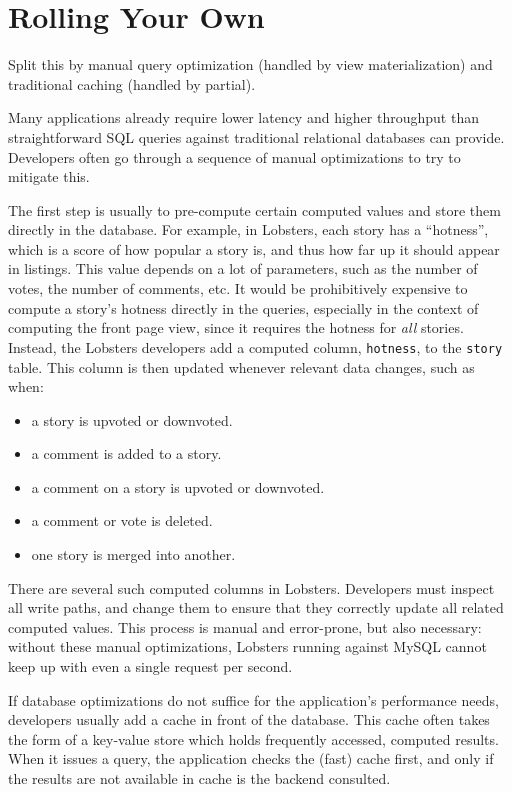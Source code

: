 \section{Rolling Your Own}
\label{s:eval:alts}

\begin{inprogress}
  Split this by manual query optimization (handled by view materialization) and
  traditional caching (handled by partial).
\end{inprogress}

Many applications already require lower latency and higher throughput than
straightforward SQL queries against traditional relational databases can
provide. Developers often go through a sequence of manual optimizations to try
to mitigate this.

The first step is usually to pre-compute certain computed values and store them
directly in the database. For example, in Lobsters, each story has a
``hotness'', which is a score of how popular a story is, and thus how far up it
should appear in listings. This value depends on a lot of parameters, such as
the number of votes, the number of comments, etc. It would be prohibitively
expensive to compute a story's hotness directly in the queries,
especially in the context of computing the front page view, since it requires
the hotness for \emph{all} stories. Instead, the Lobsters developers add a
computed column, \texttt{hotness}, to the \texttt{story} table. This column is
then updated whenever relevant data changes, such as when:

\begin{itemize}
    \item a story is upvoted or downvoted.
    \item a comment is added to a story.
    \item a comment on a story is upvoted or downvoted.
    \item a comment or vote is deleted.
    \item one story is merged into another.
\end{itemize}

There are several such computed columns in Lobsters. Developers must inspect all
write paths, and change them to ensure that they correctly update all related
computed values. This process is manual and error-prone, but also necessary:
without these manual optimizations, Lobsters running against MySQL cannot keep
up with even a single request per second.

If database optimizations do not suffice for the application's performance
needs, developers usually add a cache in front of the database. This cache
often takes the form of a key-value store which holds frequently accessed,
computed results. When it issues a query, the application checks the (fast)
cache first, and only if the results are not available in cache is the backend
consulted.


